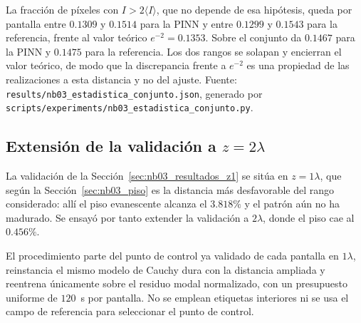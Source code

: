 La fracción de píxeles con $I>2\langle I\rangle$, que no depende de esa
hipótesis, queda por pantalla entre $0.1309$ y $0.1514$ para la PINN y entre
$0.1299$ y $0.1543$ para la referencia, frente al valor teórico
$e^{-2}=0.1353$. Sobre el conjunto da $0.1467$ para la PINN y
$0.1475$ para la referencia. Los dos rangos se solapan y
encierran el valor teórico, de modo que la discrepancia frente a $e^{-2}$ es
una propiedad de las realizaciones a esta distancia y no del ajuste. Fuente:
\texttt{results/nb03\_estadistica\_conjunto.json}, generado por
\texttt{scripts/experiments/nb03\_estadistica\_conjunto.py}.

\subsection{Extensión de la validación a \texorpdfstring{$z=2\lambda$}{z=2 lambda}}
\label{sec:nb03_extension}

La validación de la Sección~\ref{sec:nb03_resultados_z1} se sitúa en
$z=1\lambda$, que según la Sección~\ref{sec:nb03_piso} es la distancia más
desfavorable del rango considerado: allí el piso evanescente alcanza el
$3.818\%$ y el patrón aún no ha madurado. Se ensayó por tanto extender la
validación a $2\lambda$, donde el piso cae al $0.456\%$.

El procedimiento parte del punto de control ya validado de cada pantalla en
$1\lambda$, reinstancia el mismo modelo de Cauchy dura con la distancia
ampliada y reentrena únicamente sobre el residuo modal normalizado, con un
presupuesto uniforme de $120$~s por pantalla. No se emplean etiquetas
interiores ni se usa el campo de referencia para seleccionar el punto de
control.

